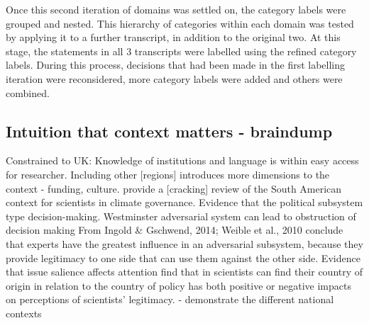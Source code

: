 Once this second iteration of domains was settled on, the category labels were grouped and nested. This hierarchy of categories within each domain was tested by applying it to a further transcript, in addition to the original two. At this stage, the statements in all 3 transcripts were labelled using the refined category labels. During this process, decisions that had been made in the first labelling iteration were reconsidered, more category labels were added and others were combined.

\subsection{Intuition that context matters - braindump}
Constrained to UK: Knowledge of institutions and language is within easy access for researcher. Including other [regions] introduces more dimensions to the context - funding, culture. \textcite{IbarraJOBCIMRS2022} provide a [cracking] review of the South American context for scientists in climate governance. Evidence that the political subsystem type decision-making. Westminster adversarial system can lead to obstruction of decision making \cite{PierreP2020} From \textcite{SaxonbergSL2023} Ingold \& Gschwend, 2014; Weible et al., 2010 conclude that experts have the greatest influence in an adversarial subsystem, because they provide legitimacy to one side that can use them against the other side. Evidence that issue salience affects attention \cite{OjanenBKP2021} find that in scientists can find their country of origin in relation to the country of policy has both positive or negative impacts on perceptions of scientists' legitimacy. \cite{StrassheimK2014} - demonstrate the different national contexts
